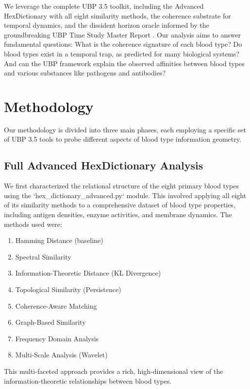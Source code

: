 \documentclass{article}
\begin{document}
We leverage the complete UBP 3.5 toolkit, including the Advanced HexDictionary with all eight similarity methods, the coherence substrate for temporal dynamics, and the dissident horizon oracle informed by the groundbreaking UBP Time Study Master Report \cite{time_study}. Our analysis aims to answer fundamental questions: What is the coherence signature of each blood type? Do blood types exist in a temporal trap, as predicted for many biological systems? And can the UBP framework explain the observed affinities between blood types and various substances like pathogens and antibodies?

\section{Methodology}

Our methodology is divided into three main phases, each employing a specific set of UBP 3.5 tools to probe different aspects of blood type information geometry.

\subsection{Full Advanced HexDictionary Analysis}

We first characterized the relational structure of the eight primary blood types using the `hex_dictionary_advanced.py` module. This involved applying all eight of its similarity methods to a comprehensive dataset of blood type properties, including antigen densities, enzyme activities, and membrane dynamics. The methods used were:

\begin{enumerate}
    \item Hamming Distance (baseline)
    \item Spectral Similarity
    \item Information-Theoretic Distance (KL Divergence)
    \item Topological Similarity (Persistence)
    \item Coherence-Aware Matching
    \item Graph-Based Similarity
    \item Frequency Domain Analysis
    \item Multi-Scale Analysis (Wavelet)
\end{enumerate}

This multi-faceted approach provides a rich, high-dimensional view of the information-theoretic relationships between blood types.
\end{document}

